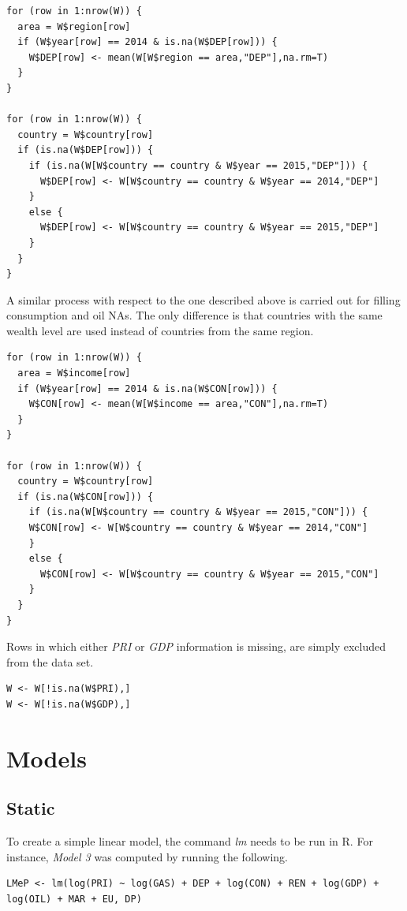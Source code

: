 \documentclass{book}
\begin{document}
\begin{appendices}
\begin{verbatim}
for (row in 1:nrow(W)) {
  area = W$region[row]
  if (W$year[row] == 2014 & is.na(W$DEP[row])) {
    W$DEP[row] <- mean(W[W$region == area,"DEP"],na.rm=T)
  }
}

for (row in 1:nrow(W)) {
  country = W$country[row]
  if (is.na(W$DEP[row])) {
    if (is.na(W[W$country == country & W$year == 2015,"DEP"])) {
      W$DEP[row] <- W[W$country == country & W$year == 2014,"DEP"]
    }
    else {
      W$DEP[row] <- W[W$country == country & W$year == 2015,"DEP"]
    }
  }
} 
\end{verbatim}

A similar process with respect to the one described above is carried out for filling consumption and oil NAs. The only difference is that countries with the same wealth level are used instead of countries from the same region.

\begin{verbatim}
for (row in 1:nrow(W)) {
  area = W$income[row]
  if (W$year[row] == 2014 & is.na(W$CON[row])) {
    W$CON[row] <- mean(W[W$income == area,"CON"],na.rm=T)
  }
}

for (row in 1:nrow(W)) {
  country = W$country[row]
  if (is.na(W$CON[row])) {
    if (is.na(W[W$country == country & W$year == 2015,"CON"])) {
    W$CON[row] <- W[W$country == country & W$year == 2014,"CON"]
    }
    else {
      W$CON[row] <- W[W$country == country & W$year == 2015,"CON"]
    }
  }
}
\end{verbatim}

Rows in which either \textit{PRI} or \textit{GDP} information is missing, are simply excluded from the data set.

\begin{verbatim}
W <- W[!is.na(W$PRI),]
W <- W[!is.na(W$GDP),]
\end{verbatim}

\chapter*{Models}
\section*{Static}

To create a simple linear model, the command \textit{lm} needs to be run in R. For instance, \textit{Model 3} was computed by running the following.

\begin{verbatim}
LMeP <- lm(log(PRI) ~ log(GAS) + DEP + log(CON) + REN + log(GDP) + log(OIL) + MAR + EU, DP)
\end{verbatim}


\end{appendices}
\end{document}
